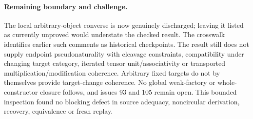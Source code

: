 \documentclass{article}
\begin{document}
\paragraph{Remaining boundary and challenge.} The local arbitrary-object converse is now genuinely discharged; leaving it listed as currently unproved would understate the checked result. The crosswalk identifies earlier such comments as historical checkpoints. The result still does not supply endpoint pseudonaturality with cleavage constraints, compatibility under changing target category, iterated tensor unit/associativity or transported multiplication/modification coherence. Arbitrary fixed targets do not by themselves provide target-change coherence. No global weak-factory or whole-constructor closure follows, and issues 93 and 105 remain open. This bounded inspection found no blocking defect in source adequacy, noncircular derivation, recovery, equivalence or fresh replay.
\end{document}
